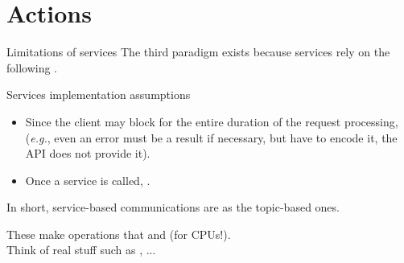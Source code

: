 
\section{Actions}
\graphicspath{{figs/section1/}}

\begin{frame}{Limitations of services}
  \justifying
  The third paradigm exists because services rely on the following .\\
  \medskip
  \begin{alertblock}{Services implementation assumptions}
    \justifying
    \begin{itemize}
      \item Since the client may block for the entire duration of the request processing,  (\emph{e.g.}, even an error must be a result if necessary, but  have to encode it, the API does not provide it).
      \item Once a service is called, .
    \end{itemize}
    \medskip
    In short, service-based communications are  as the topic-based ones.
  \end{alertblock}
  \medskip
  These make  operations that  and  (for CPUs!).\\
  Think of real stuff such as , ...
\end{frame}


